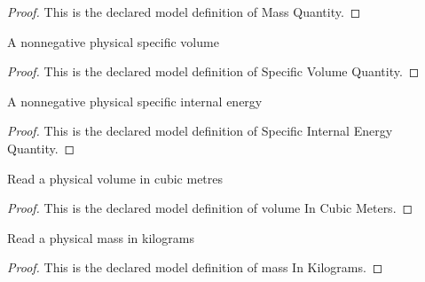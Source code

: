 \begin{proof}
  This is the declared model definition of Mass Quantity.
\end{proof}
\begin{definition}
  \label{def:physics:phyx-mini-0462:phyxminiproblems-problemphyxmini0462-specificvolumequantity}
  A nonnegative physical specific volume
\end{definition}
\begin{proof}
  This is the declared model definition of Specific Volume Quantity.
\end{proof}
\begin{definition}
  \label{def:physics:phyx-mini-0462:phyxminiproblems-problemphyxmini0462-specificinternalenergyquantity}
  A nonnegative physical specific internal energy
\end{definition}
\begin{proof}
  This is the declared model definition of Specific Internal Energy Quantity.
\end{proof}
\begin{definition}
  \label{def:physics:phyx-mini-0462:phyxminiproblems-problemphyxmini0462-volumeincubicmeters}
  Read a physical volume in cubic metres
\end{definition}
\begin{proof}
  This is the declared model definition of volume In Cubic Meters.
\end{proof}
\begin{definition}
  \label{def:physics:phyx-mini-0462:phyxminiproblems-problemphyxmini0462-massinkilograms}
  Read a physical mass in kilograms
\end{definition}
\begin{proof}
  This is the declared model definition of mass In Kilograms.
\end{proof}
